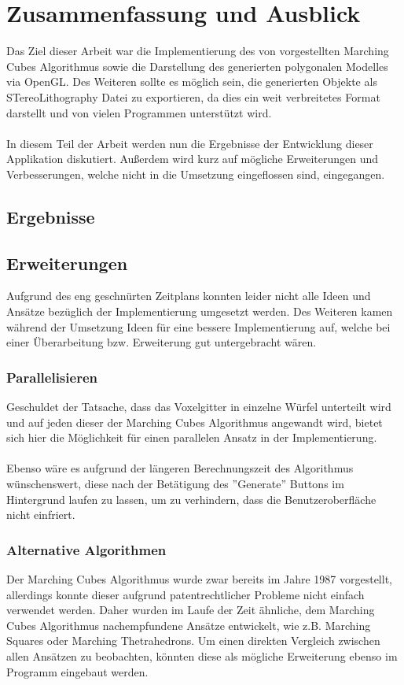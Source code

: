 \chapter{Zusammenfassung und Ausblick}
Das Ziel dieser Arbeit war die Implementierung des von \citep{MCAlgo} vorgestellten Marching Cubes Algorithmus sowie die Darstellung des generierten polygonalen Modelles via OpenGL. Des Weiteren sollte es möglich sein, die generierten Objekte als STereoLithography Datei zu exportieren, da dies ein weit verbreitetes Format darstellt und von vielen Programmen unterstützt wird.\\
\\
In diesem Teil der Arbeit werden nun die Ergebnisse der Entwicklung dieser Applikation diskutiert. Außerdem wird kurz auf mögliche Erweiterungen und Verbesserungen, welche nicht in die Umsetzung eingeflossen sind, eingegangen.

\section{Ergebnisse}

\section{Erweiterungen}
Aufgrund des eng geschnürten Zeitplans konnten leider nicht alle Ideen und Ansätze bezüglich der Implementierung umgesetzt werden. Des Weiteren kamen während der Umsetzung Ideen für eine bessere Implementierung auf, welche bei einer Überarbeitung bzw. Erweiterung gut untergebracht wären.
\subsection{Parallelisieren}
Geschuldet der Tatsache, dass das Voxelgitter in einzelne Würfel unterteilt wird und auf jeden dieser der Marching Cubes Algorithmus angewandt wird, bietet sich hier die Möglichkeit für einen parallelen Ansatz in der Implementierung.\\
\\
Ebenso wäre es aufgrund der längeren Berechnungszeit des Algorithmus wünschenswert, diese nach der Betätigung des ''Generate'' Buttons im Hintergrund laufen zu lassen, um zu verhindern, dass die Benutzeroberfläche nicht einfriert.
\subsection{Alternative Algorithmen}
Der Marching Cubes Algorithmus wurde zwar bereits im Jahre 1987 vorgestellt, allerdings konnte dieser aufgrund patentrechtlicher Probleme nicht einfach verwendet werden. Daher wurden im Laufe der Zeit ähnliche, dem Marching Cubes Algorithmus nachempfundene Ansätze entwickelt, wie z.B. Marching Squares oder Marching Thetrahedrons. Um einen direkten Vergleich zwischen allen Ansätzen zu beobachten, könnten diese als mögliche Erweiterung ebenso im Programm eingebaut werden.
